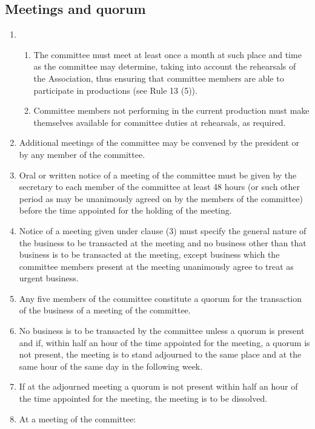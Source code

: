 \subsection{Meetings and quorum}
\label{meetings-and-quorum}
\begin{enumerate}
  \item \begin{enumerate}
    \item The committee must meet at least once a month at such place and time as the committee may determine, taking into account the rehearsals of the Association, thus ensuring that committee members are able to participate in productions (see Rule 13 (5)).
    \item Committee members not performing in the current production must make themselves available for committee duties at rehearsals, as required.
  \end{enumerate}
\item Additional meetings of the committee may be convened by the president or by any member of the committee.
\item Oral or written notice of a meeting of the committee must be given by the secretary to each member of the committee at least 48 hours (or such other period as may be unanimously agreed on by the members of the committee) before the time appointed for the holding of the meeting.
\item Notice of a meeting given under clause (3) must specify the general nature of the business to be transacted at the meeting and no business other than that business is to be transacted at the meeting, except business which the committee members present at the meeting unanimously agree to treat as urgent business.
\item \label{five-members}Any five members of the committee constitute a quorum for the transaction of the business of a meeting of the committee.
\item No business is to be transacted by the committee unless a quorum is present and if, within half an hour of the time appointed for the meeting, a quorum is not present, the meeting is to stand adjourned to the same place and at the same hour of the same day in the following week.
\item If at the adjourned meeting a quorum is not present within half an hour of the time appointed for the meeting, the meeting is to be dissolved.
\item At a meeting of the committee:
  \begin{enumerate}

\end{enumerate}
\end{enumerate}
